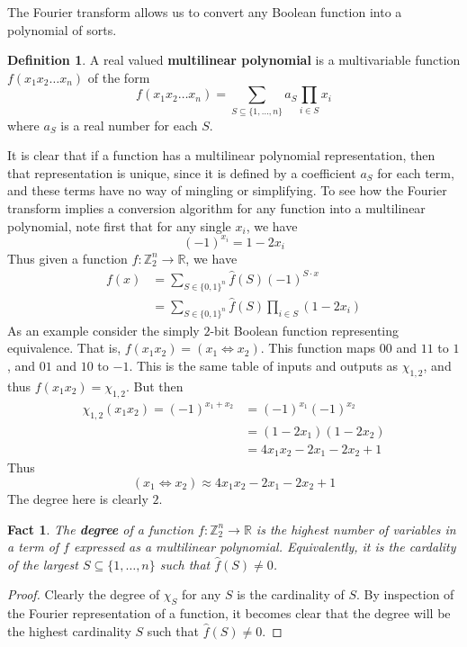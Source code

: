 \documentclass{article}
\theoremstyle{definition}
\newtheorem{definition}{Definition}[section]
\theoremstyle{plain}
\theoremstyle{theorem}
\newtheorem{fact}{Fact}[section]
\begin{document}
The Fourier transform allows us to convert any Boolean function into a polynomial of sorts.
\begin{definition}
	A real valued \textbf{multilinear polynomial} is a multivariable function $f(x_1 x_2 \ldots x_n)$ of the form
	\[ f(x_1 x_2 \ldots x_n) = \sum_{S \subseteq \{1,\ldots,n\}} a_S \prod_{i \in S} x_i \]
	where $a_S$ is a real number for each $S$.
\end{definition}
It is clear that if a function has a multilinear polynomial representation, then that representation is unique, since it is defined by a coefficient $a_S$ for each term, and these terms have no way of mingling or simplifying. To see how the Fourier transform implies a conversion algorithm for any function into a multilinear polynomial, note first that for any single $x_i$, we have
\[ (-1)^{x_i} = 1-2x_i \]
Thus given a function $f:\mathbb{Z}_2^n \to \mathbb{R}$, we have
\begin{align}
	f(x) &= \sum_{S \in \{0,1\}^n} \hat{f}(S)(-1)^{S \cdot x} \\
		&= \sum_{S \in \{0,1\}^n} \hat{f}(S)\prod_{i \in S} (1-2x_i)
\end{align}
As an example consider the simply $2$-bit Boolean function representing equivalence. That is, $f(x_1 x_2) = (x_1 \iff x_2)$. This function maps $00$ and $11$ to $1$, and $01$ and $10$ to $-1$. This is the same table of inputs and outputs as $\chi_{1,2}$, and thus $f(x_1x_2) = \chi_{1,2}$. But then
\begin{align}
	\chi_{1,2}(x_1x_2) = (-1)^{x_1 + x_2} &= (-1)^{x_1}(-1)^{x_2} \\ &= (1-2x_1)(1-2x_2) \\ &= 4x_1x_2 -2x_1 - 2x_2 + 1
\end{align} 
Thus 
\[ (x_1 \iff x_2) \approx 4x_1x_2 -2x_1 - 2x_2 + 1 \]
The degree here is clearly $2$. 
\begin{fact}
	The \textbf{degree} of a function $f: \mathbb{Z}_2^n \to \mathbb{R}$ is the highest number of variables in a term of $f$ expressed as a multilinear polynomial. Equivalently, it is the cardality of the largest $S \subseteq \{1,\ldots,n\}$ such that $\hat{f}(S) \neq 0$.
\end{fact}
\begin{proof}
	Clearly the degree of $\chi_S$ for any $S$ is the cardinality of $S$. By inspection of the Fourier representation of a function, it becomes clear that the degree will be the highest cardinality $S$ such that $\hat{f}(S) \neq 0$. 
\end{proof}
\end{document}
